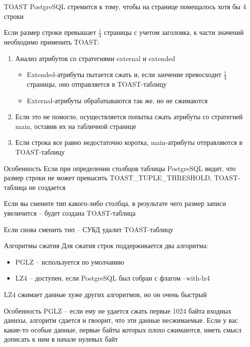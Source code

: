 \documentclass[12pt]{article}
\begin{document}
\begin{nota}{TOAST}
    PostgreSQL стремится к тому, чтобы на странице помещалось хотя бы 4 строки 

    Если размер строки превышает $\frac{1}{4}$ страницы с учетом заголовка, к части значений необходимо применить TOAST: 

    \begin{enumerate}
        \item Анализ атрибутов со стратегиями external и extended 
        
        \begin{itemize}
            \item Extended-атрибуты пытается сжать и, если занчение превосходит $\frac{1}{4}$ страницы, оно отправляется в TOAST-таблицу 
            \item External-атрибуты обрабатываются так же, но не сжимаются 
        \end{itemize}

        \item Если это не помогло, осуществляется попытка сжать атрибуты со стратегией main, оставив их на табличной странице 
        \item Если строка все равно недостаточно коротка, main-атрибуты отправляются в TOAST-таблицу
    \end{enumerate}
\end{nota}

\begin{Remark}{Особенность}
    Если при определении столбцов таблицы PostgreSQL видит, что размер строки не может превысить TOAST\_TUPLE\_THRESHOLD, TOAST-таблица не создается 

    Если вы смените тип какого-либо столбца, в результате чего размер записи увеличится -- будет создана TOAST-таблица 

    Если снова сменить тип -- СУБД удалит TOAST-таблицу 
\end{Remark}

\begin{nota}{Алгоритмы сжатия}
    Для сжатия строк поддерживается два алгоритма:

    \begin{itemize}
        \item PGLZ -- используется по умолчанию 
        \item LZ4 -- доступен, если PostgreSQL был собран с флагом --with-lz4
    \end{itemize}

    LZ4 сжимает данные хуже других алгоритмов, но он очень быстрый 

    Особенность PGLZ -- если ему не удается сжать первые 1024 байта входных даннхы, алгоритм сдается и гвоорит, что эти данные несжимаемые. Если у вас какие-то особые данные, первые байты которых плохо сжимаются, иметь смысл дописать к ним в начале нулевых байт 
\end{nota}
\end{document}
